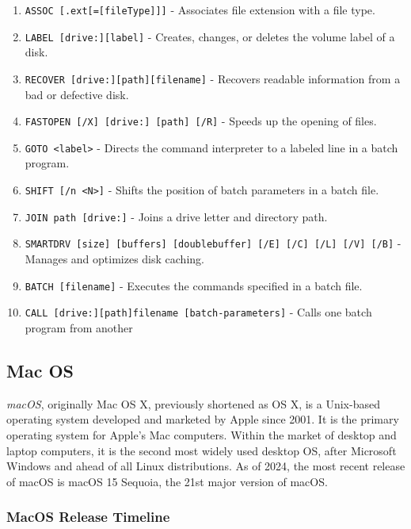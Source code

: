 \begin{enumerate}
    \item \texttt{ASSOC [.ext[=[fileType]]]} - Associates file extension with a file type.
    \item \texttt{LABEL [drive:][label]} - Creates, changes, or deletes the volume label of a disk.
    \item \texttt{RECOVER [drive:][path][filename]} - Recovers readable information from a bad or defective disk.
    \item \texttt{FASTOPEN [/X] [drive:] [path] [/R]} - Speeds up the opening of files.
    \item \texttt{GOTO <label>} - Directs the command interpreter to a labeled line in a batch program.
    \item \texttt{SHIFT [/n <N>]} - Shifts the position of batch parameters in a batch file.
    \item \texttt{JOIN path [drive:]} - Joins a drive letter and directory path.
    \item \texttt{SMARTDRV [size] [buffers] [doublebuffer] [/E] [/C] [/L] [/V] [/B]} - Manages and optimizes disk caching.
    \item \texttt{BATCH [filename]} - Executes the commands specified in a batch file.
    \item \texttt{CALL [drive:][path]filename [batch-parameters]} - Calls one batch program from another
    
\end{enumerate}

\newpage
\subsection{Mac OS}

\textit{macOS}, originally Mac OS X, previously shortened as OS X, is a Unix-based operating system developed and marketed by Apple since 2001. It is the primary operating system for Apple's Mac computers. Within the market of desktop and laptop computers, it is the second most widely used desktop OS, after Microsoft Windows and ahead of all Linux distributions. As of 2024, the most recent release of macOS is macOS 15 Sequoia, the 21st major version of macOS. \cite{wikipediaMacOSVersion, wikipediaMacOSWikipedia, setappFullList}

\subsubsection{MacOS Release Timeline}

